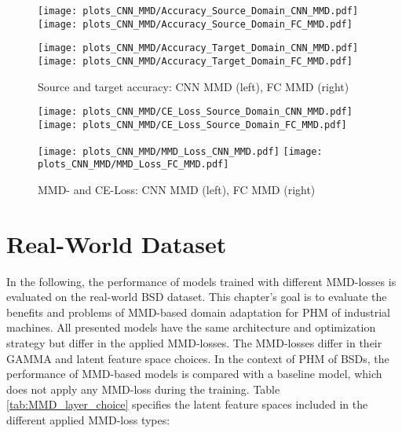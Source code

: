 \begin{figure}[htp]
  \centering
  \texttt{[image: plots\_CNN\_MMD/Accuracy\_Source\_Domain\_CNN\_MMD.pdf]}
  \hspace{.3cm}
  \texttt{[image: plots\_CNN\_MMD/Accuracy\_Source\_Domain\_FC\_MMD.pdf]}

  \vspace{.1cm}

  \texttt{[image: plots\_CNN\_MMD/Accuracy\_Target\_Domain\_CNN\_MMD.pdf]}
  \hspace{.3cm}
  \texttt{[image: plots\_CNN\_MMD/Accuracy\_Target\_Domain\_FC\_MMD.pdf]}

  \caption{Source and target accuracy: CNN MMD (left), FC MMD (right)}
  \label{fig:accuracy_cnn_and_no_cnn_mmd}
\end{figure}

\begin{figure}[H]
  \centering
  \texttt{[image: plots\_CNN\_MMD/CE\_Loss\_Source\_Domain\_CNN\_MMD.pdf]}
  \hspace{.3cm}
  \texttt{[image: plots\_CNN\_MMD/CE\_Loss\_Source\_Domain\_FC\_MMD.pdf]}

  \vspace{.1cm}

  \texttt{[image: plots\_CNN\_MMD/MMD\_Loss\_CNN\_MMD.pdf]}
  \hspace{.1cm}
  \texttt{[image: plots\_CNN\_MMD/MMD\_Loss\_FC\_MMD.pdf]}

  \caption{MMD- and CE-Loss: CNN MMD (left), FC MMD (right)}
  \label{fig:loss_cnn_and_no_cnn_mmd}
\end{figure}

\section{Real-World Dataset}\label{sec:results_real_world_dataset}
In the following, the performance of models trained with different MMD-losses is evaluated on the real-world BSD dataset. This chapter's goal is to evaluate the benefits and problems of MMD-based domain adaptation for PHM of industrial machines. All presented models have the same architecture and optimization strategy but differ in the applied MMD-losses. The MMD-losses differ in their GAMMA and latent feature space choices. In the context of PHM of BSDs, the performance of MMD-based models is compared with a baseline model, which does not apply any MMD-loss during the training. Table \ref{tab:MMD_layer_choice}  specifies the latent feature spaces included in the different applied MMD-loss types:

